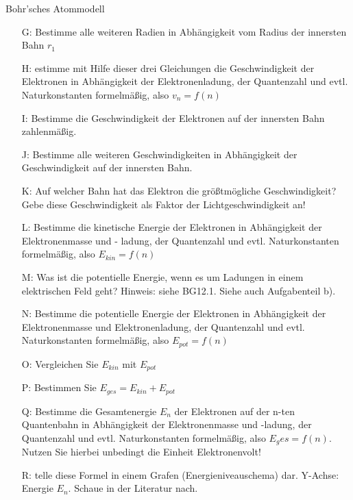 \documentclass[11pt,a4paper,oneside]{article}
\begin{document}
\begin{aufgabe}{Bohr'sches Atommodell}
\begin{itemize}[left=20mm]
\begin{itemize}[left=-10mm]
				\item [G:] Bestimme alle weiteren Radien in Abhängigkeit vom Radius der innersten Bahn $r_1$
				\item [H:] estimme mit Hilfe dieser drei Gleichungen die Geschwindigkeit der Elektronen in Abhängigkeit der Elektronenladung, der Quantenzahl und evtl. Naturkonstanten formelmäßig, also $v_n = f(n)$
				\item [I:] Bestimme die Geschwindigkeit der Elektronen auf der innersten Bahn zahlenmäßig.
				\item [J:] Bestimme alle weiteren Geschwindigkeiten in Abhängigkeit der Geschwindigkeit auf der innersten Bahn.
			    \item [K:] Auf welcher Bahn hat das Elektron die größtmögliche Geschwindigkeit? Gebe diese Geschwindigkeit als Faktor der Lichtgeschwindigkeit an!
				\item [L:] Bestimme die kinetische Energie der Elektronen in Abhängigkeit der Elektronenmasse und -
				ladung, der Quantenzahl und evtl. Naturkonstanten formelmäßig, also $E_{kin} = f(n)$
				
				\newpage
				
				\item [M:] Was ist die potentielle Energie, wenn es um Ladungen in einem elektrischen Feld geht? Hinweis:
				siehe BG12.1. Siehe auch Aufgabenteil b).
				\item [N:] Bestimme die potentielle Energie der Elektronen in Abhängigkeit der Elektronenmasse und Elektronenladung, der Quantenzahl und evtl. Naturkonstanten formelmäßig, also $E_{pot} = f(n)$
				\item [O:] Vergleichen Sie $E_{kin}$ mit $E_{pot}$
				\item [P:] Bestimmen Sie $E_{ges} = E_{kin} + E_{pot}$ 
				\item [Q:] Bestimme die Gesamtenergie $E_n$ der Elektronen auf der n-ten Quantenbahn in Abhängigkeit der
				Elektronenmasse und -ladung, der Quantenzahl und evtl. Naturkonstanten formelmäßig, also $E_ges = f(n)$. Nutzen Sie hierbei unbedingt die Einheit Elektronenvolt!
				\item [R:] telle diese Formel in einem Grafen (Energieniveauschema) dar. Y-Achse: Energie $E_n$. Schaue in
				der Literatur nach.		
			\end{itemize}
		\end{itemize}
	\end{aufgabe}
	
	
	
	\newpage
	
\end{document}

